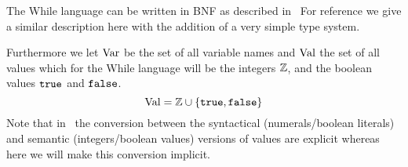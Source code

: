 The While language can be written in BNF as described in~\cite{} %
For reference we give a similar description here with the addition of a very
simple type system.

Furthermore we let $\mbox{$\mathrm{Var}$}$ be the set of all variable names and $\mbox{$\mathrm{Val}$}$ the
set of all values which for the While language will be the integers $\mathbb{Z}$,
and the boolean values $\mbox{\texttt{true}}$ and $\mbox{\texttt{false}}$. 
\begin{equation*}
  \mbox{$\mathrm{Val}$} = \mathbb{Z} \cup \left\{ \mbox{\texttt{true}}, \mbox{\texttt{false}} \right\}
\end{equation*}
Note that in~\cite{} %
the conversion between the syntactical (numerals\slash boolean literals) and semantic
(integers\slash boolean values) versions of values are explicit whereas here we will
make this conversion implicit.

